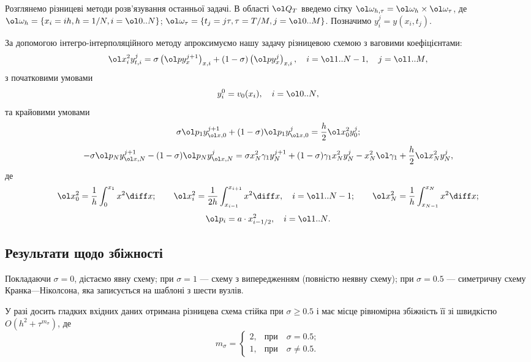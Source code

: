 Розглянемо різницеві методи розв'язування останньої задачі. В області $\ol Q_T$ введемо сітку $\ol \omega_{h, \tau} = \ol \omega_h \times \ol \omega_\tau$, де $\ol \omega_h = \{x_i = i h, h = 1/N, i = \range{0}{N}\}$; $\ol \omega_\tau = \{t_j = j \tau, \tau = T/M, j = \range{0}{M}\}$. Позначимо $y_i^j = y(x_i, t_j)$. \medskip

За допомогою інтегро-інтерполяційного методу апроксимуємо нашу задачу різницевою схемою з ваговими коефіцієнтами:
\begin{equation}
    \ol x_i^2 y_{t, i}^j = \sigma \left( \ol p y_x^{j + 1} \right)_{x, i} + (1 - \sigma) \left( \ol p y_x^j \right)_{x, i}, \quad i = \range{1}{N - 1}, \quad j = \range{1}{M},
\end{equation}
з початковими умовами
\begin{equation*}
    y_i^0 = v_0(x_i), \quad i = \range{0}{N},
\end{equation*}
та крайовими умовами
\begin{equation}
    \sigma \ol p_1 y_{\ol x, 0}^{j + 1} + (1 - \sigma) \ol p_1 y_{\ol x, 0}^j = \frac{h}{2} \ol x_0^2 y_0^j;
\end{equation}
\begin{equation}
    -\sigma \ol p_N y_{\ol x, N}^{j + 1} - (1 - \sigma) \ol p_N y_{\ol x, N}^j = \sigma x_N^2 \gamma_1 y_N^{j + 1} + (1 - \sigma) \gamma_1 x_N^2 y_N^j - x_N^2 \ol \gamma_1 + \frac{h}{2} \ol x_N^2 y_N^j,
\end{equation}
де
\begin{equation*}
    \ol x_0^2 = \frac{1}{h} \int_0^{x_1} x^2 \diff x; \qquad \ol x_i^2 = \frac{1}{2h} \int_{x_{i - 1}}^{x_{i + 1}} x^2 \diff x, \quad i = \range{1}{N - 1}; \qquad \ol x_N^2 = \frac{1}{h} \int_{x_{N - 1}}^{x_N} x^2 \diff x;
\end{equation*}
\begin{equation*}
    \ol p_i = a \cdot x_{i - 1/2}^2, \quad i = \range{1}{N}.
\end{equation*}

\subsection{Результати щодо збіжності}

Покладаючи $\sigma = 0$, дістаємо явну схему; при $\sigma = 1$ --- схему з випередженням (повністю неявну схему); при $\sigma = 0.5$ --- симетричну схему Кранка---Ніколсона, яка записується на шаблоні з шести вузлів. \medskip

У разі досить гладких вхідних даних отримана різницева схема стійка при $\sigma \ge 0.5$ і має місце рівномірна збіжність її зі швидкістю $O(h^2 + \tau^{m_\sigma})$, де
\begin{equation*}
    m_\sigma = \begin{cases}
        2, & \text{при} \quad \sigma = 0.5; \\
        1, & \text{при} \quad \sigma \ne 0.5.
    \end{cases}
\end{equation*}

